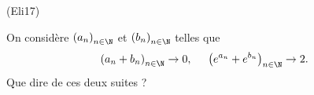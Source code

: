 \begin{tiny}(Eli17)\end{tiny} On considère $\left( a_n\right) _{n\in \N}$ et  $\left( b_n\right) _{n\in \N}$ telles que
\begin{displaymath}
  \left( a_n + b_n\right) _{n\in \N}\rightarrow 0,\hspace{0.5cm}
  \left( e^{a_n} + e^{b_n}\right) _{n\in \N}\rightarrow 2 .
\end{displaymath}
Que dire de ces deux suites ?
